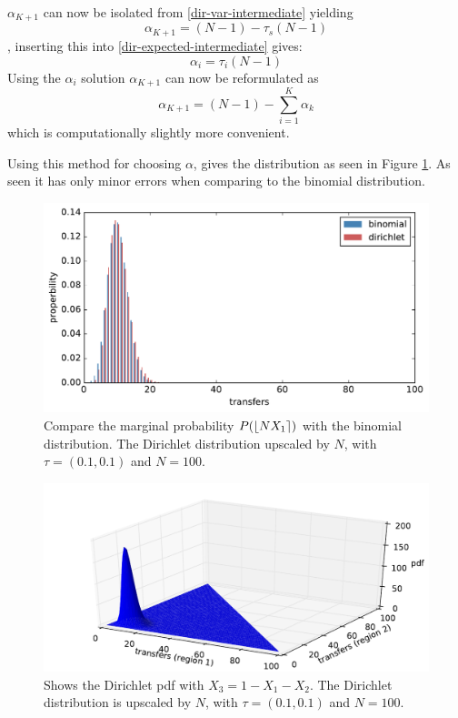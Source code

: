 $\alpha_{K+1}$ can now be isolated from \eqref{dir-var-intermediate} yielding
\begin{equation}
\alpha_{K+1} = (N - 1) - \tau_s (N - 1)
\end{equation}
, inserting this into \eqref{dir-expected-intermediate} gives:
\begin{equation}
\alpha_{i} = \tau_i (N - 1)
\end{equation}
Using the $\alpha_{i}$ solution $\alpha_{K+1}$ can now be reformulated as
\begin{equation}
\alpha_{K+1} = (N - 1) - \sum_{i=1}^K \alpha_k
\end{equation}
which is computationally slightly more convenient.

Using this method for choosing $\alpha$, gives the distribution as seen in Figure \ref{fig:dirichlet-validation-marginal}. As seen it has only minor errors when comparing to the binomial distribution.

\begin{figure}[H]
	\centering
	\includegraphics[width= 0.8 \linewidth]{plots/dirichlet-validation-marginal}
	\caption{Compare the marginal probability $P(\iround*{N X_1})$ with the binomial distribution. The Dirichlet distribution upscaled by $N$, with $\tau = (0.1, 0.1)$ and $N = 100$.}
	\label{fig:dirichlet-validation-marginal}
\end{figure}

\begin{figure}[H]
	\centering
	\includegraphics[width= 0.8 \linewidth]{plots/dirichlet-validation-pdf}
	\caption{Shows the Dirichlet pdf with $X_3 = 1- X_1 - X_2$. The Dirichlet distribution is upscaled by $N$, with $\tau = (0.1, 0.1)$ and $N = 100$.}
\end{figure}

